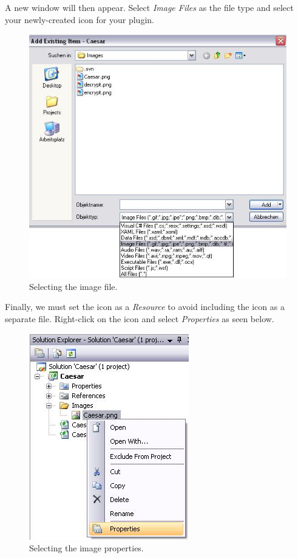 A new window will then appear. Select \textit{Image Files} as the file type and select your newly-created icon for your plugin.

\begin{figure}[h!]
	\centering
		\includegraphics{figures/choose_icon.jpg}
	\caption{Selecting the image file.}
	\label{fig:choose_icon}
\end{figure}
\clearpage

Finally, we must set the icon as a \textit{Resource} to avoid including the icon as a separate file. Right-click on the icon and select \textit{Properties} as seen below.

\begin{figure}[h!]
	\centering
		\includegraphics{figures/icon_properties.jpg}
	\caption{Selecting the image properties.}
	\label{fig:icon_properties}
\end{figure}

